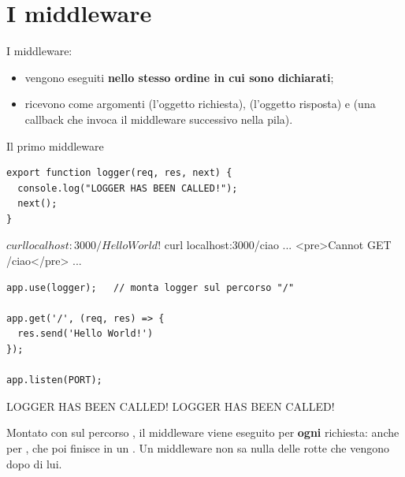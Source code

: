 \section{I middleware}


I middleware:

\begin{itemize}
  \item vengono eseguiti \textbf{nello stesso ordine in cui sono dichiarati};
  \item ricevono come argomenti  (l'oggetto richiesta), 
        (l'oggetto risposta) e  (una callback che invoca il
        middleware successivo nella pila).
\end{itemize}

\begin{esempio}{Il primo middleware}
\begin{affianco}[0.45]
\begin{lstlisting}[style=js, name=middleware.js]
export function logger(req, res, next) {
  console.log("LOGGER HAS BEEN CALLED!");
  next();
}
\end{lstlisting}
\begin{console}[Terminale]
$ curl localhost:3000/
Hello World!
$ curl localhost:3000/ciao
...
<pre>Cannot GET /ciao</pre>
...
\end{console}
\risultato
\begin{lstlisting}[style=js, name=index.js]
app.use(logger);   // monta logger sul percorso "/"

app.get('/', (req, res) => {
  res.send('Hello World!')
});

app.listen(PORT);
\end{lstlisting}
\begin{console}
LOGGER HAS BEEN CALLED!
LOGGER HAS BEEN CALLED!
\end{console}
\end{affianco}

Montato con  sul percorso \code{/}, il middleware viene eseguito
per \textbf{ogni} richiesta: anche per , che poi finisce in un
. Un middleware non sa nulla delle rotte che vengono dopo di lui.
\end{esempio}

